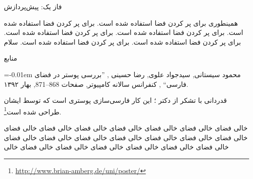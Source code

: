 \documentclass[debug,a0paper,portrait,persian]{xebaposter}
\begin{document}
\begin{poster}
\begin{posterbox}[name=phase1,column=0,span=1,below=imagedataset]{فاز یک{:} پیش‌پردازش}
\ptext[16-17]
\end{posterbox}
\begin{posterbox}[name=adhoc,column=0,span=1,below=phase1]{همینطوری}
{برای پر کردن فضا استفاده شده است. برای پر کردن فضا استفاده شده است. برای پر کردن فضا استفاده شده است. 
برای پر کردن فضا استفاده شده است. برای پر کردن فضا استفاده شده است. برای پر کردن فضا استفاده شده است. 
سلام}
\end{posterbox}
\begin{posterbox}[name=references,column=1,span=2,below=results]{منابع}
     \smaller
%     
     \renewcommand{\section}[2]{\vskip 0.05em}
       \begin{thebibliography}{1}\itemsep=-0.01em
       \setlength{\baselineskip}{0.4em}
       \bibitem{}
       محمود سیستانی, سیدجواد علوی, رضا حسینی
	, ''بررسی پوستر در فضای فارسی``
	, کنفرانس سالانه کامپیوتر, صفحات 868--871, بهار ۱۳۹۲.
       \end{thebibliography}
\end{posterbox}
\begin{posterbox}[name=ack,column=0,span=2,below=references]{قدردانی}
با تشکر از دکتر ؛ این کار فارسی‌سازی پوستری است که توسط ایشان طراحی شده است\footnote{\url{http://www.brian-amberg.de/uni/poster/}}.
\end{posterbox}
\begin{posterbox}[name=ack,column=2,span=1,below=references]{خالی}
فضای خالی فضای خالی فضای خالی فضای خالی فضای خالی فضای خالی فضای خالی فضای خالی فضای خالی فضای خالی 
فضای خالی فضای خالی فضای خالی فضای خالی فضای خالی فضای خالی فضای خالی فضای خالی فضای خالی فضای خالی 
\end{posterbox}%
\end{poster}
\end{document}
